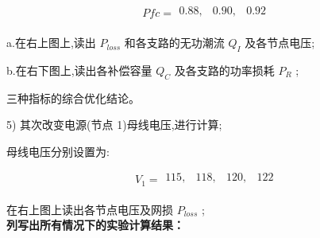 \documentclass[a4paper]{ctexrep}
\begin{document}
                    $$Pfc=\begin{matrix}
                        0.88, & 0.90, & 0.92 \\
                    \end{matrix}$$

                    \quad a.在右上图上,读出 $P_{loss}$ 和各支路的无功潮流 $Q_I$ 及各节点电压;

                    \quad b.在右下图上,读出各补偿容量 $Q_C$ 及各支路的功率损耗 $P_R$ ;
                
                
                    
                    
                    
                    三种指标的综合优化结论。
                    
                    5) 其次改变电源(节点 1)母线电压,进行计算;
                    
                    母线电压分别设置为:

                    $$V_1=\begin{matrix}
                        115, & 118, & 120, & 122 \\
                    \end{matrix}$$

                    \quad 在右上图上读出各节点电压及网损 $P_{loss}$ ; \\
                    
                    
                    

                    \textbf{列写出所有情况下的实验计算结果：} 
\end{document}
